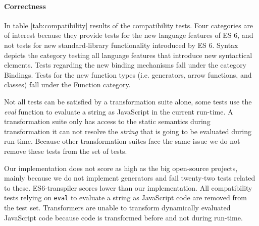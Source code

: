 \paragraph{Correctness} \label{sec:correctness}
In table \ref{tab:compatibility} results of the compatibility tests. Four categories are of interest because they provide tests for the new language features of ES 6, and not tests for new standard-library functionality introduced by ES 6. Syntax depicts the category testing all language features that introduce new syntactical elements. Tests regarding the new binding mechanisms fall under the category Bindings. Tests for the new function types (i.e. generators, arrow functions, and classes) fall under the Function category.

Not all tests can be satisfied by a transformation suite alone, some tests use the \textit{eval} function to evaluate a string as JavaScript in the current run-time. A transformation suite only has access to the static semantics during transformation it can not resolve the \textit{string} that is going to be evaluated during run-time. Because other transformation suites face the same issue we do not remove these tests from the set of tests.

Our implementation does not score as high as the big open-source projects, mainly because we do not implement generators and fail twenty-two tests related to these. ES6-transpiler scores lower than our implementation. All compatibility tests relying on \lstinline$eval$ to evaluate a string as JavaScript code are removed from the test set. Transformers are unable to transform dynamically evaluated JavaScript code because code is transformed before and not during run-time.

